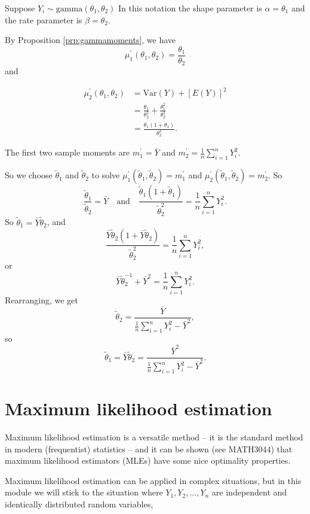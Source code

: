 \documentclass[]{book}
\theoremstyle{definition}
\theoremstyle{definition}
\theoremstyle{definition}
\theoremstyle{remark}
\let\BeginKnitrBlock\begin \let\EndKnitrBlock\end
\begin{document}
\BeginKnitrBlock{example}
\protect\hypertarget{exm:unnamed-chunk-96}{}{\label{exm:unnamed-chunk-96}
}Suppose \(Y_i \sim \text{gamma}(\theta_1, \theta_2)\) In this notation
the shape parameter is \(\alpha = \theta_1\) and the rate parameter is
\(\beta = \theta_2\).

By Proposition \ref{prp:gammamoments}, we have
\[\mu_1^\prime(\theta_1, \theta_2) = \frac{\theta_1}{\theta_2}\] and

\begin{align*}
\mu_2^\prime(\theta_1, \theta_2) &= 
\text{Var}(Y) + [E(Y)]^2 \\
&= \frac{\theta_1}{\theta_2^2} + \frac{\theta_1^2}{\theta_2^2} \\
&= \frac{\theta_1(1 + \theta_1)}{\theta_2^2}.
\end{align*}

The first two sample moments are \(m_1^\prime = \bar Y\) and
\(m_2^\prime = \frac{1}{n}\sum_{i=1}^n Y_i^2\).

So we choose \(\tilde \theta_1\) and \(\tilde \theta_2\) to solve
\(\mu_1^\prime(\tilde \theta_1, \tilde \theta_2) = m_1^\prime\) and
\(\mu_2^\prime(\tilde \theta_1, \tilde \theta_2) = m_2^\prime\). So
\[\frac{\tilde \theta_1}{\tilde \theta_2} = \bar Y
\quad \text{and} \quad
\frac{\tilde \theta_1(1 + \tilde \theta_1)}{\tilde \theta_2^2} = \frac{1}{n}\sum_{i=1}^n Y_i^2.\]
So \(\tilde \theta_1 = \bar Y \tilde \theta_2\), and
\[\frac{\bar Y \tilde \theta_2 (1 + \bar Y \tilde \theta_2)}{\tilde \theta_2^2} = \frac{1}{n}\sum_{i=1}^n Y_i^2,\]
or
\[\bar Y \tilde{\theta}_2^{-1} + {\bar Y}^2 = \frac{1}{n}\sum_{i=1}^n Y_i^2.\]
Rearranging, we get
\[\tilde \theta_2 = \frac{\bar Y}{\frac{1}{n}\sum_{i=1}^n Y_i^2 - {\bar Y}^2},\]
so
\[\tilde \theta_1 = \bar Y \tilde \theta_2 = \frac{\bar Y^2}{\frac{1}{n}\sum_{i=1}^n Y_i^2 - {\bar Y}^2}.\]
\EndKnitrBlock{example}

\section{Maximum likelihood
estimation}\label{maximum-likelihood-estimation}

Maximum likelihood estimation is a versatile method -- it is the
standard method in modern (frequentist) statistics -- and it can be
shown (see MATH3044) that maximum likelihood estimators (MLEs) have some
nice optimality properties.

Maximum likelihood estimation can be applied in complex situations, but
in this module we will stick to the situation where
\(Y_1, Y_2, \ldots, Y_n\) are independent and identically distributed
random variables,
\end{document}
